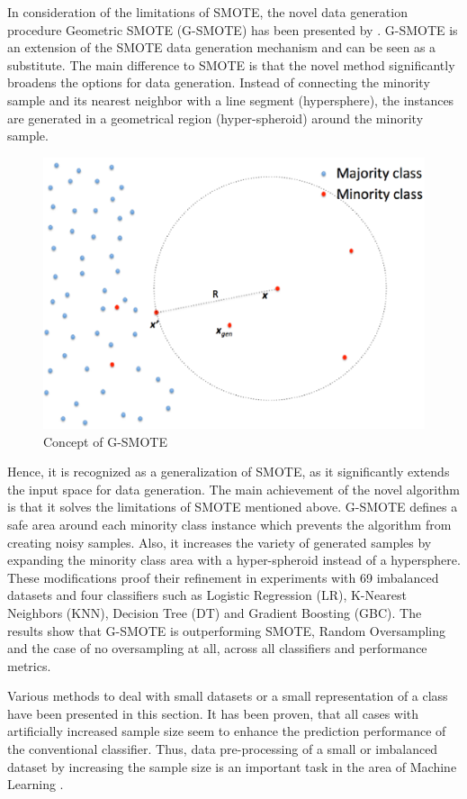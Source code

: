 \documentclass[parskip=full]{scrartcl}
\begin{document}
In consideration of the limitations of SMOTE, the novel data generation
procedure Geometric SMOTE (G-SMOTE) has been presented by \cite{Douzas.2017}.
G-SMOTE is an extension of the SMOTE data generation mechanism and can be seen
as a substitute. The main difference to SMOTE is that the novel method
significantly broadens the options for data generation. Instead of connecting
the minority sample and its nearest neighbor with a line segment (hypersphere),
the instances are generated in a geometrical region (hyper-spheroid) around the
minority sample. 

\begin{figure}[H]
	\centering
	\includegraphics[width=0.5\linewidth]{./resources/gsmote}
	\caption{Concept of G-SMOTE}
	\label{fig:gsmote}
\end{figure}

Hence, it is recognized as a generalization of SMOTE, as it significantly
extends the input space for data generation. The main achievement of the novel
algorithm is that it solves the limitations of SMOTE mentioned above. G-SMOTE
defines a safe area around each minority class instance which prevents the
algorithm from creating noisy samples. Also, it increases the variety of
generated samples by expanding the minority class area with a hyper-spheroid
instead of a hypersphere. These modifications proof their refinement in
experiments with 69 imbalanced datasets and four classifiers such as Logistic
Regression (LR), K-Nearest Neighbors (KNN), Decision Tree (DT) and Gradient
Boosting (GBC). The results show that G-SMOTE is outperforming SMOTE, Random
Oversampling and the case of no oversampling at all, across all classifiers and
performance metrics.  

Various methods to deal with small datasets or a small representation of a class
have been presented in this section. It has been proven, that all cases with
artificially increased sample size seem to enhance the prediction performance of
the conventional classifier. Thus, data pre-processing of a small or imbalanced
dataset by increasing the sample size is an important task in the area of
Machine Learning \cite{Ruparel.2013}.
\end{document}

